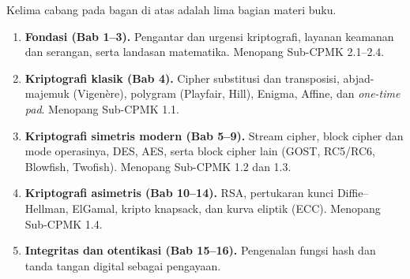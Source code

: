 \documentclass[../main.tex]{subfiles}
\begin{document}
Kelima cabang pada bagan di atas adalah lima bagian materi buku.

\begin{enumerate}[label=\textbf{Bagian \arabic*.}, leftmargin=*]
    \item \textbf{Fondasi (Bab 1--3).} Pengantar dan urgensi kriptografi,
          layanan keamanan dan serangan, serta landasan matematika. Menopang
          Sub-CPMK 2.1--2.4.
    \item \textbf{Kriptografi klasik (Bab 4).} Cipher substitusi dan
          transposisi, abjad-majemuk (Vigen\`ere), polygram (Playfair, Hill),
          Enigma, Affine, dan \textit{one-time pad}. Menopang Sub-CPMK 1.1.
    \item \textbf{Kriptografi simetris modern (Bab 5--9).} Stream cipher, block
          cipher dan mode operasinya, DES, AES, serta block cipher lain (GOST,
          RC5/RC6, Blowfish, Twofish). Menopang Sub-CPMK 1.2 dan 1.3.
    \item \textbf{Kriptografi asimetris (Bab 10--14).} RSA, pertukaran kunci
          Diffie--Hellman, ElGamal, kripto knapsack, dan kurva eliptik (ECC).
          Menopang Sub-CPMK 1.4.
    \item \textbf{Integritas dan otentikasi (Bab 15--16).} Pengenalan fungsi
          hash dan tanda tangan digital sebagai pengayaan.
\end{enumerate}
\end{document}

